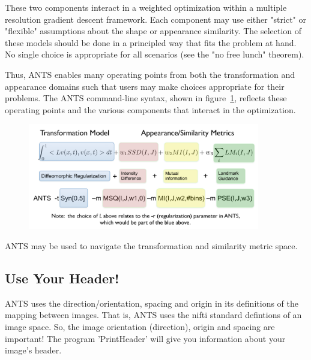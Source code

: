 \documentclass{InsightArticle}
\begin{document}
These two components interact in a weighted optimization within a multiple resolution gradient descent framework. Each component may use either "strict" or "flexible" assumptions about the shape or appearance similarity. The selection of these models should be done in a principled way that fits the problem at hand. No single choice is appropriate for all scenarios (see the "no free lunch" theorem). 

Thus, ANTS enables many operating points from both the transformation and appearance domains such that users may make choices appropriate for their problems. The ANTS command-line syntax, shown in figure~\ref{fig:cmd}, reflects these operating points and the various components that interact in the optimization.
\begin{figure}
\includegraphics[width=0.9\textwidth]{Figures/ANTSSyntax.pdf} 
\vspace{-0.1in}
\label{fig:cmd}
\end{figure}
ANTS may be used to navigate the transformation and similarity metric space. 
\subsection{Use Your Header!} ANTS uses the direction/orientation, spacing
and origin in its definitions of the mapping between images.  That is,
ANTS uses the nifti standard defintions of an image space.  So, the
image orientation (direction), origin and spacing are important!  The
program 'PrintHeader' will give you information about your image's header.
\end{document}
